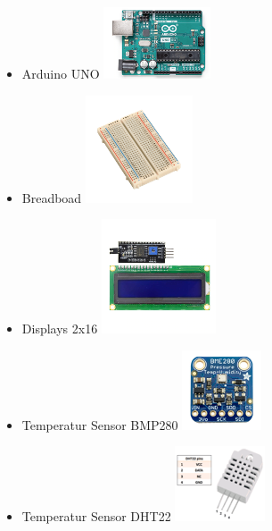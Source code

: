 \documentclass[conference]{IEEEtran}
\begin{document}
\begin{itemize}
	\item Arduino UNO 
		\includegraphics[width=0.27\linewidth]{fig15}
	
	
\item Breadboad	
	\includegraphics[width=0.27\linewidth]{fig16}

	
\item Displays 2x16 
		\includegraphics[width=0.27\linewidth]{fig17}
	
	
\item Temperatur Sensor BMP280 
 	\includegraphics[width=0.27\linewidth]{fig18}
	
	
\item Temperatur Sensor DHT22
	\includegraphics[width=0.27\linewidth]{fig19}
	

\end{itemize}
\end{document}
